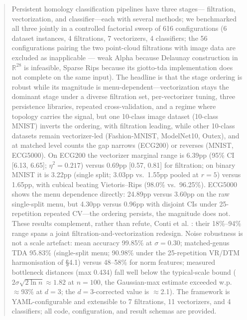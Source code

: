 \documentclass[12pt, a4paper]{report}
\theoremstyle{definition}
\theoremstyle{plain}
\theoremstyle{remark}
\begin{document}
\begin{abstract}

Persistent homology classification pipelines have three stages---
filtration, vectorization, and classifier---each with several methods;
we benchmarked all three jointly in a controlled factorial sweep of
616 configurations (6 dataset instances, 4 filtrations, 7 vectorizers,
4 classifiers; the 56 configurations pairing the two point-cloud
filtrations with image data are excluded as inapplicable --- weak
Alpha because Delaunay construction in $\mathbb{R}^{28}$ is
infeasible, Sparse Rips because its giotto-tda implementation does
not complete on the same input). The headline is that
the stage ordering is robust while its magnitude is
menu-dependent---vectorization stays the dominant stage under a
diverse filtration set, per-vectorizer tuning, three persistence
libraries, repeated cross-validation, and a regime where topology
carries the signal, but one 10-class image dataset (10-class MNIST) inverts the
ordering, with filtration leading, while other 10-class datasets
remain vectorizer-led (Fashion-MNIST, ModelNet10, Outex), and at matched level counts the gap narrows
(ECG200) or reverses (MNIST, ECG5000). On ECG200 the vectorizer marginal range is 6.39pp
(95\% CI [6.13, 6.65]; $\eta^2 = 0.217$) versus 0.69pp [0.57, 0.81]
for filtration; on binary MNIST it is 3.22pp (single split; 3.03pp vs.\ 1.55pp
pooled at $r{=}5$) versus 1.65pp, with cubical beating Vietoris--Rips
(98.0\% vs.\ 96.25\%). ECG5000 shows the menu dependence directly: 24.89pp versus
3.60pp on the raw single-split menu, but 4.30pp versus 0.96pp with
disjoint CIs under 25-repetition repeated CV---the ordering persists,
the magnitude does not. These results complement, rather than refute,
Conti et al. \cite{conti2022}: their 18\%--94\% range spans a joint
filtration-and-vectorization redesign. Noise robustness is not a
scale artefact: mean accuracy 99.85\% at $\sigma = 0.30$;
matched-genus TDA 95.83\% (single-split menu; 90.98\% under the
25-repetition VR/DTM harmonisation of \S4.1) versus 48--58\% for norm
features; measured
bottleneck distances (max 0.434) fall well below the typical-scale
bound ($2\sigma\sqrt{2\ln n}\approx 1.82$ at $n{=}100$, the
Gaussian-max estimate exceeded w.p.\ $\approx$93\% at $d{=}3$; the
$d{=}3$-corrected value is $\approx$2.1). The framework is
YAML-configurable and extensible to 7 filtrations, 11 vectorizers,
and 4 classifiers; all code, configuration, and result schemas are
provided.

\end{abstract}
\end{document}
